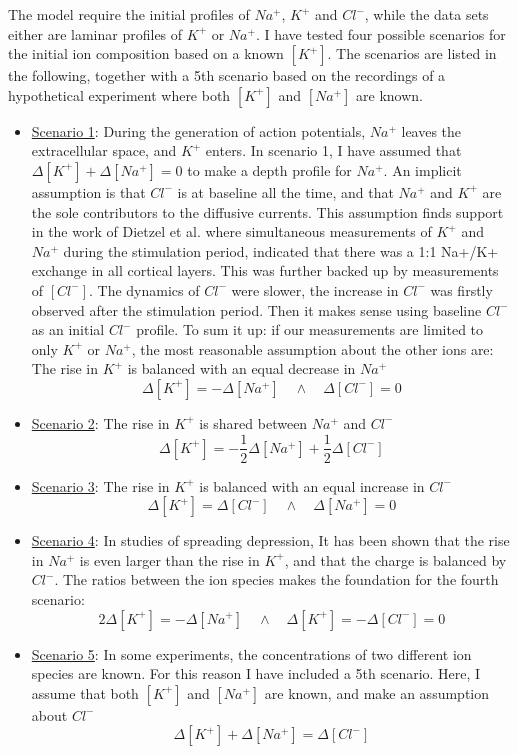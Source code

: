 \documentclass{article}
\begin{document}
The model require the initial profiles of $Na^+$, $K^+$ and $Cl^-$, while the data sets either are laminar profiles of $K^+$ or $Na^+$. I have tested four possible scenarios for the initial ion composition based on a known $[K^+]$. The scenarios are listed in the following, together with a 5th scenario based on the recordings of a hypothetical experiment where  both $[K^+]$ and $[Na^+]$ are known.

\begin{itemize}\label{Scenarios}
	\item[]\underline{Scenario 1}: During the generation of action potentials, $Na^+$ leaves the extracellular space, and $K^+$ enters. In scenario 1, I have assumed that $\Delta [K^+] + \Delta [Na^+] = 0$ to make a depth profile for $Na^+$. An implicit assumption is that $Cl^-$ is at baseline all the time, and that $Na^+$ and $K^+$ are the sole contributors to the diffusive currents. This assumption finds support in the work of Dietzel et al. \cite{Dietzel1982} where simultaneous measurements of $K^+$ and $ Na^+$ during the stimulation period, indicated that there was a 1:1 Na+/K+ exchange in all cortical layers. This was further backed up by measurements of $[Cl^-]$. The dynamics of $Cl^-$ were slower, the increase in $Cl^-$ was firstly observed after the stimulation period. Then it makes sense using baseline $Cl^-$ as an initial $Cl^-$ profile. 
To sum it up: if our measurements are limited to only $K^+$ or $Na^+$, the most reasonable assumption about the other ions are:
	The rise in $K^+$ is balanced with an equal decrease in $Na^+$
	  $$\Delta [K^+] = -\Delta [Na^+] \quad \land \quad \Delta [Cl^-] =0$$
	\item[]\underline{Scenario 2}:  The rise in $K^+$ is shared between $Na^+$ and $Cl^-$
	$$\Delta [K^+] = -\frac{1}{2} \Delta [Na^+] +\frac{1}{2} \Delta [Cl^-] $$ 
		\item[]\underline{Scenario 3}:  The rise in $K^+$ is balanced with an equal increase in $Cl^-$
	  $$\Delta [K^+] = \Delta [Cl^-] \quad \land \quad \Delta [Na^+] =0$$
	  \item[]\underline{Scenario 4}:  In studies of spreading depression\cite{Ataya2015}\cite{Herreras1993}, It has been shown that the rise in $Na^+$ is even larger than the rise in $K^+$, and that the charge is balanced by $Cl^-$. The ratios between the ion species makes the foundation for the fourth scenario:
	$$2\Delta [K^+] = - \Delta [Na^+] \quad \land \quad \Delta [K^+] =  -\Delta [Cl^-] =0$$ 
	\item[]\underline{Scenario 5}: In some experiments, the concentrations of two different ion species are known. For this reason I have included a 5th scenario. Here, I assume that both $[K^+]$ and $[Na^+]$ are known, and make an assumption about $Cl^-$
	$$\Delta [K^+] + \Delta [Na^+] = \Delta[Cl^-] $$
\end{itemize}
\end{document}
